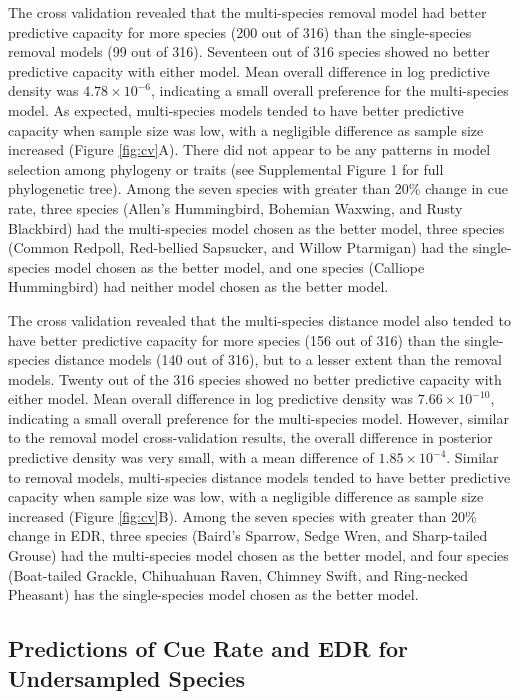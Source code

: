 \documentclass[12pt]{article}
\begin{document}
\par The cross validation revealed that the multi-species removal model had better predictive capacity for more species (200 out of 316) than the single-species removal models (99 out of 316).
Seventeen out of 316 species showed no better predictive capacity with either model.
Mean overall difference in log predictive density was $4.78 \times 10^{-6}$, indicating a small overall preference for the multi-species model.
As expected, multi-species models tended to have better predictive capacity when sample size was low, with a negligible difference as sample size increased (Figure \ref{fig:cv}A).
There did not appear to be any patterns in model selection among phylogeny or traits (see Supplemental Figure 1 for full phylogenetic tree).
Among the seven species with greater than 20\% change in cue rate, three species (Allen's Hummingbird, Bohemian Waxwing, and Rusty Blackbird) had the multi-species model chosen as the better model, three species (Common Redpoll, Red-bellied Sapsucker, and Willow Ptarmigan) had the single-species model chosen as the better model, and one species (Calliope Hummingbird) had neither model chosen as the better model.

\par The cross validation revealed that the multi-species distance model also tended to have better predictive capacity for more species (156 out of 316) than the single-species distance models (140 out of 316), but to a lesser extent than the removal models.
Twenty out of the 316 species showed no better predictive capacity with either model.
Mean overall difference in log predictive density was $7.66 \times 10^{-10}$, indicating a small overall preference for the multi-species model.
However, similar to the removal model cross-validation results, the overall difference in posterior predictive density was very small, with a mean difference of $1.85 \times 10^{-4}$.
Similar to removal models, multi-species distance models tended to have better predictive capacity when sample size was low, with a negligible difference as sample size increased (Figure \ref{fig:cv}B).
Among the seven species with greater than 20\% change in EDR, three species (Baird's Sparrow, Sedge Wren, and Sharp-tailed Grouse) had the multi-species model chosen as the better model, and four species (Boat-tailed Grackle, Chihuahuan Raven, Chimney Swift, and Ring-necked Pheasant) has the single-species model chosen as the better model.


\subsection{Predictions of Cue Rate and EDR for Undersampled Species}
\end{document}
